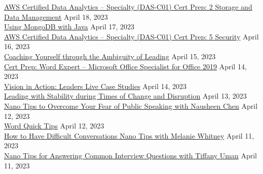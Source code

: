 \documentclass[10pt]{res} %
\begin{document}
\begin{resume}
\href{https://www.linkedin.com/learning/certificates/c986e3514eb40f5921702c3cfa3573b709147064d61406e8c851a617ee74123c}{\color{blue}AWS Certified Data Analytics -- Specialty (DAS-C01) Cert Prep: 2 Storage and Data Management} \hfill April 18, 2023 \\
\href{https://www.linkedin.com/learning/certificates/63c174179a4e513f2efb7b73116c9942f653e81d5a345006f14e49b78f524c7b}{\color{blue}Using MongoDB with Java} \hfill April 17, 2023 \\
\href{https://www.linkedin.com/learning/certificates/b49c5536d15a765602f039c0c5866e26cf8a4fe9b7bb06430324cd38064b100b}{\color{blue}AWS Certified Data Analytics -- Specialty (DAS-C01) Cert Prep: 5 Security} \hfill April 16, 2023 \\
\href{https://www.linkedin.com/learning/certificates/4e2878e964c4b5a711c1643ff69ea4acd098178502894642841368f42be89bb0}{\color{blue}Coaching Yourself through the Ambiguity of Leading} \hfill April 15, 2023 \\
\href{https://www.linkedin.com/learning/certificates/9014f93413e13b2a39506d21d18830f74247be2c435f66c56b0283457ae75a5f}{\color{blue}Cert Prep: Word Expert -- Microsoft Office Specialist for Office 2019} \hfill April 14, 2023 \\
\href{https://www.linkedin.com/learning/certificates/78e7af535e4bee01a3c4db85cabcb4f2bef3e2c2a4f9dda8bd00bf8f45c7c9b2}{\color{blue}Vision in Action: Leaders Live Case Studies} \hfill April 14, 2023 \\
\href{https://www.linkedin.com/learning/certificates/4a5bd99072f63eb51e6530400a14f0d0af9732e588b6894f176d473b123f41ee}{\color{blue}Leading with Stability during Times of Change and Disruption} \hfill April 13, 2023 \\
\href{https://www.linkedin.com/learning/certificates/e1e88db4a8653e9a95b75199067ac1ff3034d50dd88eba755decef52ef4e66ac}{\color{blue}Nano Tips to Overcome Your Fear of Public Speaking with Nausheen Chen} \hfill April 12, 2023 \\
\href{https://www.linkedin.com/learning/certificates/b3dcd925b7ef5d4ab0d3375508fb116f3567b59aa94fe62bf18de8703f12482e}{\color{blue}Word Quick Tips} \hfill April 12, 2023 \\
\href{https://www.linkedin.com/learning/certificates/e9e61843fe5259bde762afd50c7a5454a9dacfd06c9dd11db3a7e55ad8c0a5c7}{\color{blue}How to Have Difficult Conversations Nano Tips with Melanie Whitney} \hfill April 11, 2023 \\
\href{https://www.linkedin.com/learning/certificates/fee65b70f08e940c4fac1451e58891f46c75309e9d6c3be33a6c45efb331288e}{\color{blue}Nano Tips for Answering Common Interview Questions with Tiffany Uman} \hfill April 11, 2023 \\

\end{resume}
\end{document}

